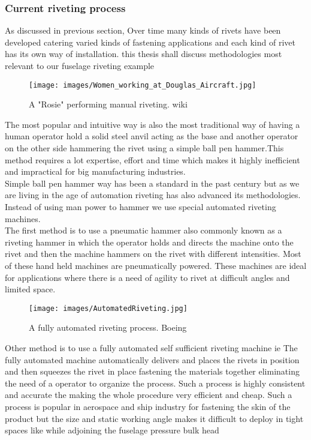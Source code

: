 \documentclass{article}
\begin{document}
\subsubsection{Current riveting process}

As discussed in previous section, Over time many kinds of rivets have been developed catering varied kinds of fastening applications and each kind of rivet has its own way of installation. this thesis shall discuss methodologies most relevant to our fuselage riveting example\\

\begin{figure}[htp]
    \centering
    \texttt{[image: images/Women\_working\_at\_Douglas\_Aircraft.jpg]}
    \caption{A "Rosie" performing manual riveting. wiki}
    \label{fig: rosieManualRiveter}
\end{figure}



The most popular and intuitive way is also the most traditional way of having a human operator hold a solid steel anvil acting as the base and another operator on the other side hammering the rivet using a simple ball pen hammer.This method requires a lot expertise, effort and time which makes it highly inefficient and impractical for big manufacturing industries.\\

Simple ball pen hammer way has been a standard in the past century but as we are living in the age of automation riveting has also advanced its methodologies. Instead of using man power to hammer we use special automated riveting machines.\\

The first method is to use a pneumatic hammer also commonly known as a riveting hammer in which the operator holds and directs the machine onto the rivet and then the machine hammers on the rivet with different intensities. Most of these hand held machines are pneumatically powered. These machines are ideal for applications where there is a need of agility to rivet at difficult angles and  limited space.\\

\begin{figure}[htp]
    \centering
    \texttt{[image: images/AutomatedRiveting.jpg]}
    \caption{A fully automated riveting process. Boeing}
    \label{fig: rosieManualRiveter}
\end{figure}

Other method is to use a fully automated self sufficient riveting machine ie The fully automated machine automatically delivers and places the rivets in position and then squeezes the rivet in place fastening the materials together eliminating the need of a operator to organize the process. Such a process is highly consistent and accurate the making the whole procedure very efficient and cheap. Such a process is popular in aerospace and ship industry for fastening the skin of the product but the size and static working angle makes it difficult to deploy in tight spaces like while adjoining the fuselage pressure bulk head
\end{document}
